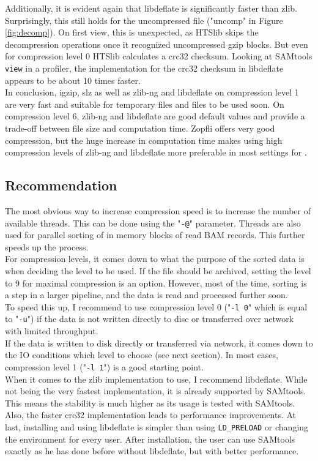 Additionally, it is evident again that libdeflate is significantly faster than zlib. Surprisingly, this still holds for the uncompressed file ("uncomp" in Figure \ref{fig:decomp}). On first view, this is unexpected, as HTSlib skips the decompression operations once it recognized uncompressed gzip blocks. But even for compression level 0 HTSlib calculates a crc32 checksum. Looking at SAMtools \texttt{view} in a profiler, the implementation for the crc32 checksum in libdeflate appears to be about 10 times faster. \\
In conclusion, igzip, slz as well as zlib-ng and libdeflate on compression level 1 are very fast and suitable for temporary files and files to be used soon. On compression level 6, zlib-ng and libdeflate are good default values and provide a trade-off between file size and computation time. Zopfli offers very good compression, but the huge increase in computation time makes using high compression levels of zlib-ng and libdeflate more preferable in most settings for \sort.

\subsection{Recommendation}
The most obvious way to increase compression speed is to increase the number of available threads. This can be done using the "\texttt{-@}" parameter. Threads are also used for parallel sorting of in memory blocks of read BAM records. This further speeds up the process. \\
For compression levels, it comes down to what the purpose of the sorted data is when deciding the level to be used. 
If the file should be archived, setting the level to 9 for maximal compression is an option. However, most of the time, sorting is a step in a larger pipeline, and the data is read and processed further soon. \\
To speed this up, I recommend to use compression level 0 ("\texttt{-l 0}" which is equal to "\texttt{-u}") if the data is not written directly to  disc or transferred over network with limited throughput. \\
If the data is written to disk directly or transferred via network, it comes down to the IO conditions which level to choose (see next section). In most cases, compression level 1 ("\texttt{-l 1}") is a good starting point.\\
When it comes to the zlib implementation to use, I recommend libdeflate. While not being the very fastest implementation, it is already supported by SAMtools. This means the stability is much higher as its usage is tested with SAMtools. Also, the faster crc32 implementation leads to performance improvements. At last, installing and using libdeflate is simpler than using \texttt{LD\_PRELOAD} or changing the environment for every user. After installation, the user can use SAMtools exactly as he has done before without libdeflate, but with better performance.

